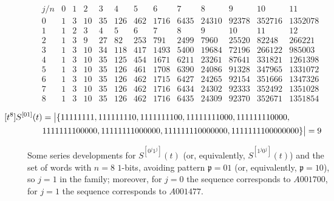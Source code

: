 \begin{table}
\begin{equation*}\begin{array}{c|cccccccccccc}j/n & 0 & 1 & 2 & 3 & 4 & 5 & 6 & 7 & 8 & 9 & 10 & 11\\\hline0 & 1 & 3 & 10 & 35 & 126 & 462 & 1716 & 6435 & 24310 & 92378 & 352716 & 1352078\\1 & 1 & 2 & 3 & 4 & 5 & 6 & 7 & 8 & 9 & 10 & 11 & 12\\2 & 1 & 3 & 9 & 27 & 82 & 253 & 791 & 2499 & 7960 & 25520 & 82248 & 266221\\3 & 1 & 3 & 10 & 34 & 118 & 417 & 1493 & 5400 & 19684 & 72196 & 266122 & 985003\\4 & 1 & 3 & 10 & 35 & 125 & 454 & 1671 & 6211 & 23261 & 87641 & 331821 & 1261398\\5 & 1 & 3 & 10 & 35 & 126 & 461 & 1708 & 6390 & 24086 & 91328 & 347965 & 1331072\\6 & 1 & 3 & 10 & 35 & 126 & 462 & 1715 & 6427 & 24265 & 92154 & 351666 & 1347326\\7 & 1 & 3 & 10 & 35 & 126 & 462 & 1716 & 6434 & 24302 & 92333 & 352492 & 1351028\\8 & 1 & 3 & 10 & 35 & 126 & 462 & 1716 & 6435 & 24309 & 92370 & 352671 & 1351854\end{array}\end{equation*}

\begin{displaymath}
    \hspace{-1.5cm}
    \begin{split}
    [t^{8}]S^{[01]}(t) &= \big|\lbrace 11111111, 111111110, 1111111100, 11111111000, 111111110000,\\
    & 1111111100000, 11111111000000, 111111110000000, 1111111100000000\rbrace\big| = 9
    \end{split}
\end{displaymath}

\caption{Some series developments for $S^{[0^{j}1^j]}(t)$ (or, equivalently,
$S^{[1^{j}0^{j}]}(t)$) and the set of words with $n=8$ $1$-bits, avoiding pattern
$\mathfrak{p}=01$ (or, equivalently, $\mathfrak{p}=10$), so $j=1$ in the family; moreover,
for $j=0$ the sequence corresponds to $A001700$, for $j=1$ the sequence corresponds to  $A001477$.}
\label{tbl:S0_j:1_j}
\end{table}

